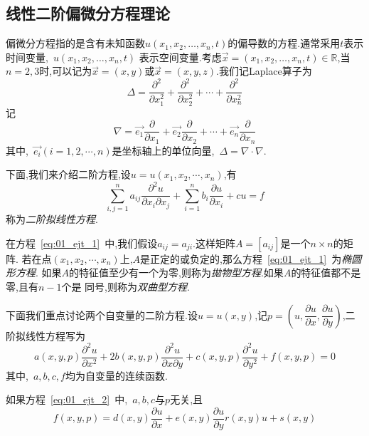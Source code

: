 \subsection{线性二阶偏微分方程理论}
偏微分方程指的是含有未知函数$u(x_1,x_2,\ldots,x_n,t)$的偏导数的方程.通常采用$t$表示时间变量,~$u(x_1,x_2,\ldots,x_n,t)$
表示空间变量.考虑$\vec{x}=(x_1,x_2,\ldots,x_n,t)\in \mathbb{R}$,当$n=2,3$时,可以记为$\vec{x}=(x,y)$或$\vec{x}=
(x,y,z)$.我们记Laplace算子为
\begin{equation*}
 \Delta = \dfrac{\partial^2}{\partial x_1^2}+\dfrac{\partial^2}{\partial x_2^2}+\cdots +  \dfrac{\partial^2}{\partial x_n^2}
\end{equation*}
记
\begin{equation*}
 \nabla = \vec{e_1}\dfrac{\partial}{\partial x_1}+\vec{e_2}\dfrac{\partial}{\partial x_2}
	  +\cdots + \vec{e_n}\dfrac{\partial}{\partial x_n}
\end{equation*}
其中,~$\vec{e_i}(i=1,2,\cdots,n)$是坐标轴上的单位向量,~$\Delta=\nabla\cdot\nabla$.\par
下面,我们来介绍二阶方程,设$u=u(x_1,x_2,\cdots,x_n)$,有
\begin{equation}\label{eq:01_ejt_1}
 \sum_{i,j=1}^{n}a_{ij}\dfrac{\partial^2 u}{\partial x_i \partial x_j}
 +\sum_{i=1}^{n} b_i\dfrac{\partial u}{\partial x_i} + cu=f
\end{equation}
称为\emph{二阶拟线性方程}.\par
在方程~\eqref{eq:01_ejt_1}~中,我们假设$a_{ij}=a_{ji}$.这样矩阵$A=[a_{ij}]$是一个$n\times n$的矩阵.
若在点$(x_1,x_2,\cdots,x_n)$上,$A$是正定的或负定的,那么方程~\eqref{eq:01_ejt_1}~为\emph{椭圆形方程}.
如果$A$的特征值至少有一个为零,则称为\emph{拋物型方程}.如果$A$的特征值都不是零,且有$n-1$个是
同号,则称为\emph{双曲型方程}.\par
下面我们重点讨论两个自变量的二阶方程.设$u=u(x,y)$,记$p=\left(u,\dfrac{\partial u}{\partial x},
\dfrac{\partial u}{\partial y}\right)$,二阶拟线性方程写为
\begin{equation}\label{eq:01_ejt_2}
 a(x,y,p)\dfrac{\partial^2 u}{\partial x^2}+2b(x,y,p)\dfrac{\partial^2 u}{\partial x\partial y}
 +c(x,y,p)\dfrac{\partial^2 u}{\partial y^2}+f(x,y,p)=0
\end{equation}
其中,~$a,b,c,f$均为自变量的连续函数.\par
如果方程~\eqref{eq:01_ejt_2}~中,~$a,b,c$与$p$无关,且
\begin{equation}
 f(x,y,p)=d(x,y)\dfrac{\partial u}{\partial x}+e(x,y)\dfrac{\partial u}{\partial y}
	  r(x,y)u+s(x,y)
\end{equation}
